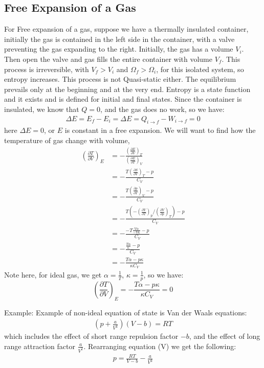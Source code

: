 \documentclass[11pt,oneside]{book}
\theoremstyle{break}
\theoremstyle{break}
\newcommand{\pd}{\partial}
\newcommand{\lr}[1]{\left( #1 \right)}
\newcommand{\example}{\color{green}Example: \color{black}}
\begin{document}
\subsection{Free Expansion of a Gas}
For Free expansion of a gas, suppose we have a thermally insulated container, initially the gas is contained in the left side in the container, with a valve preventing the gas expanding to the right. Initially, the gas has a volume $V_i$. Then open the valve and gas fills the entire container with volume $V_f$. This process is irreversible, with $V_f > V_i$ and $\Omega_f > \Omega_i$, for this isolated system, so entropy increases. This process is not Quasi-static either. The equilibrium prevails only at the beginning and at the very end. Entropy is a state function and it exists and is defined for initial and final states. Since the container is insulated, we know that $Q = 0$, and the gas does no work, so we have:
\begin{align*}
\Delta E = E_f - E_i = \Delta E = Q_{i\to f} - W_{i \to f} = 0
\end{align*}
here $\Delta E=0$, or $E$ is constant in a free expansion. We will want to find how the temperature of gas change with volume,
\begin{align*}
\lr{\frac{\pd T}{\pd V}}_E &= -\frac{\lr{\frac{\pd E }{ \pd V}}_T}{\lr{\frac{\pd E}{\pd T}}_V} \\
&= -\frac{T\lr{\frac{\pd S}{\pd V}}_T - p}{C_V} \\
&= - \frac{T\lr{\frac{\pd p}{\pd T}}_V-p}{C_V} \\
&= -\frac{T\left( - \lr{\frac{\pd V}{\pd T}}_p / \lr{\frac{\pd V}{\pd p}}_T\right) - p}{C_V} \\
&= -\frac{-T\frac{V \alpha}{-V\kappa} - p}{C_V} \\
&= -\frac{\frac{T\alpha}{\kappa} - p}{C_V} \\
&= -\frac{T\alpha - p\kappa}{\kappa C_V}
\end{align*}
Note here, for ideal gas, we get $\alpha = \frac{1}{T}$, $\kappa = \frac{1}{p}$, so we have:$$\lr{\frac{\pd T}{\pd V}}_E = -\frac{T\alpha - p\kappa}{\kappa C_V} = 0$$

\example Example of non-ideal equation of state is Van der Waals equations:
\begin{align*}
\left(p+\frac{a}{V^2}\right)(V-b) = RT  \tag{V}
\end{align*}
which includes the effect of short range repulsion factor $-b$, and the effect of long range attraction factor $\frac{a}{V^2}$. Rearranging equation (V) we get the following:
\begin{align*}
p = \frac{RT}{V-b} - \frac{a}{V^2}
\end{align*}
\end{document}
